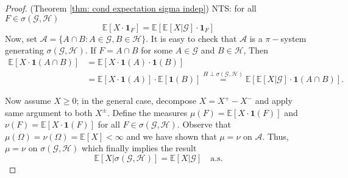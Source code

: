\documentclass{article}
\begin{document}
\begin{proof}{(Theorem \ref{thm: cond expectation sigma indep})}
    NTS: for all $ F\in \sigma( \mathcal{G}, \mathcal{H})$
    \[
	    \mathbb{E}[X\cdot \mathbf{1}_{F}] =\mathbb{E}[\mathbb{E}[X| \mathcal{G}]\cdot \mathbf{1}_{F}]
    \]
    Now, set $  \mathcal{ A} = \{A\cap B : A\in \mathcal{ G}, B\in \mathcal{ H}\}$. It is easy to check that $  \mathcal{A}$ is a $ \pi-$system generating $ \sigma( \mathcal{G}, \mathcal{H})$. If $ F = A\cap B$ for some $ A\in \mathcal{G}$ and $ B \in \mathcal{H}$, Then 
    \[
    \begin{array}{ll}
	    \mathbb{E}[X\cdot \mathbf{1}(A\cap B)] &=\mathbb{E}[X\cdot \mathbf{1}(A)\cdot \mathbf{1}(B)] \\
						  & =\mathbb{E}[X\cdot \mathbf{1}(A)]\cdot\mathbb{E}[ \mathbf{1}(B)] \stackrel{H\perp \sigma( \mathcal{G}, \mathcal{H})}{=}\mathbb{E}[\mathbb{E}[X| \mathcal{G}]\cdot \mathbf{1}(A\cap B)].
    \end{array}
    \]

    Now assume $ X\geq 0$; in the general case, decompose $ X = X^{+}- X^{-}$ and apply same argument to both $ X^{\pm}$. Define the measures $ \mu(F) =\mathbb{E}[X\cdot \mathbf{1}(F)]$ and $ \nu(F) =\mathbb{E}[X\cdot \mathbf{1}(F)]$ for all $ F\in \sigma( \mathcal{G}, \mathcal{H})$. Observe that $ \mu(\Omega) = \nu(\Omega) =\mathbb{E}[X]<\infty$ and we have shown that $ \mu = \nu$ on $ \mathcal{A}$. Thus, $ \mu=\nu$ on $ \sigma( \mathcal{G}, \mathcal{H})$ which finally implies the result 
\[
	\mathbb{E}[X|\sigma( \mathcal{G}, \mathcal{H})] =\mathbb{E}[X| \mathcal{G}] \quad \text{a.s.}
\]


\end{proof}
\end{document}
